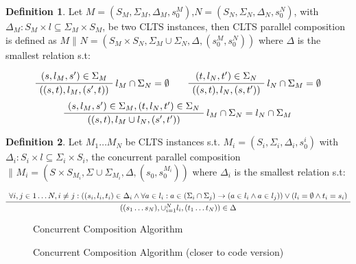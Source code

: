 \documentclass{article}
\theoremstyle{definition}
\newtheorem{definition}{Definition}[section]
\newcommand{\automaton}[1]{$#1 = (S_{#1}, \Sigma_{#1}, \Delta_{#1}, s_{0}^{#1})$}
\newcommand{\ltsComposition}[3]{$#1 \parallel_{#3} #2 = (S_{#1}\times S_{#2}, \Sigma_{#1} \cup \Sigma_{#2}, \Delta, (s_{0}^{#1},s_{0}^{#2}))$}
\begin{document}
\begin{definition} 
	Let \automaton{M},\automaton{N}, with $\Delta_M : S_M \times l \subseteq \Sigma_M \times S_M$, be two CLTS instances, then CLTS parallel composition is defined as \ltsComposition{M}{N}{} where $\Delta$ is the smallest relation s.t:
	\begin{center}
		\begin{equation}
			\AxiomC{$(s, l_M, s') \in \Sigma_M $}\RightLabel{$l_M \cap \Sigma_N = \emptyset$}
			\UnaryInfC{$((s,t),l_M,(s',t))$}
			\DisplayProof
			\quad\quad
			\AxiomC{$(t, l_N, t') \in \Sigma_N $}\RightLabel{$l_N \cap \Sigma_M = \emptyset$}
			\UnaryInfC{$((s,t),l_N,(s,t'))$}
			\DisplayProof
		\end{equation}		
		\begin{equation}
		\AxiomC{$(s, l_M, s') \in \Sigma_M,(t, l_N, t') \in \Sigma_N  $}\RightLabel{$l_M \cap \Sigma_N = l_N \cap \Sigma_M$}
		\UnaryInfC{$((s,t),l_M \cup l_N,(s',t'))$}
		\DisplayProof
		\end{equation}	
	\end{center}
\end{definition}

\begin{definition} 
	Let $M_1 \ldots M_N$ be CLTS instances s.t. $M_i= (S_{i}, \Sigma_{i}, \Delta_{i}, s_{0}^{i})$ with $\Delta_i : S_i \times l \subseteq \Sigma_i \times S_i$, the concurrent parallel composition \ltsComposition{}{M_i}{} where $\Delta_i$ is the smallest relation s.t:
	\begin{center}
		\begin{equation}
		\AxiomC{$\forall i,j \in 1 \ldots N, i \neq j: ((s_i, l_i, t_i) \in \Delta_i \wedge \forall a \in l_i : a \in (\Sigma_i \cap \Sigma_j) \rightarrow (a \in l_i \wedge a \in l_j)) \vee (l_i = \emptyset \wedge t_i = s_i)$}
		\UnaryInfC{$((s_1 \ldots s_N),\cup_{i=1}^{N}l_i,(t_1 \ldots t_N)) \in \Delta$}
		\DisplayProof
		\end{equation}		
	\end{center}
\end{definition}

\begin{figure}[ht]
	\begin{center}
		 
		\caption{Concurrent Composition Algorithm}
		\label{fig:dfs-code}
	\end{center}
\end{figure}
\begin{figure}[ht]
	\begin{center}
		 
		\caption{Concurrent Composition Algorithm (closer to code version)}
		\label{fig:dfs-code2}
	\end{center}
\end{figure}
\end{document}
